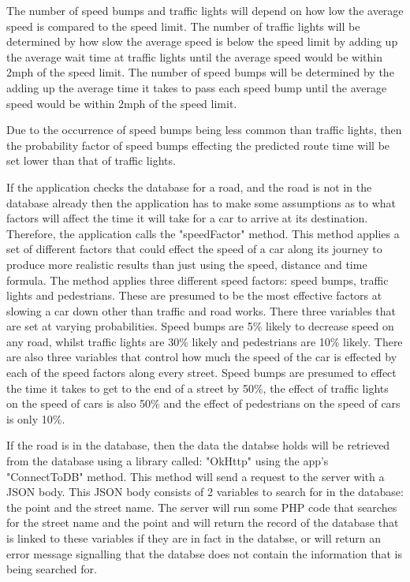 \documentclass[12pt,a4paper]{article}
\begin{document}
The number of speed bumps and traffic lights will depend on how low the average speed is compared to the speed limit. The number of traffic lights will be determined by how slow the average speed is below the speed limit by adding up the average wait time at traffic lights until the average speed would be within 2mph of the speed limit. The number of speed bumps will be determined by the adding up the average time it takes to pass each speed bump until the average speed would be within 2mph of the speed limit. 

Due to the occurrence of speed bumps being less common than traffic lights, then the probability factor of speed bumps effecting the predicted route time will be set lower than that of traffic lights.

If the application checks the database for a road, and the road is not in the database already then the application has to make some assumptions as to what factors will affect the time it will take for a car to arrive at its destination. Therefore, the application calls the "speedFactor" method. This method applies a set of different factors that could effect the speed of a car along its journey to produce more realistic results than just using the speed, distance and time formula. The method applies three different speed factors: speed bumps, traffic lights and pedestrians. These are presumed to be the most effective factors at slowing a car down other than traffic and road works. There three variables that are set at varying probabilities. Speed bumps are 5\% likely to decrease speed on any road, whilst traffic lights are 30\% likely and pedestrians are 10\% likely. There are also three variables that control how much the speed of the car is effected by each of the speed factors along every street. Speed bumps are presumed to effect the time it takes to get to the end of a street by 50\%, the effect of traffic lights on the speed of cars is also 50\% and the effect of pedestrians on the speed of cars is only 10\%.

If the road is in the database, then the data the databse holds will be retrieved from the database using a library called: "OkHttp" using the app's "ConnectToDB" method. This method will send a request to the server with a JSON body. This JSON body consists of 2 variables to search for in the database: the point and the street name. The server will run some PHP code that searches for the street name and the point and will return the record of the database that is linked to these variables if they are in fact in the databse, or will return an error message signalling that the databse does not contain the information that is being searched for.
\end{document}
